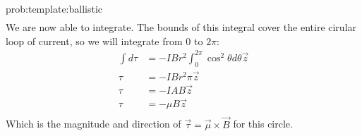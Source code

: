 \begin{solution}{prob:template:ballistic}
\begin{align*}
	\end{align*}
	We are now able to integrate. The bounds of this integral cover the entire cirular loop of current, so we will integrate from $0$ to $2\pi$:
	\begin{align*}
	\int d\tau &= -IBr^2 \int_{0}^{2\pi}\cos^2\theta d\theta \vec z \\
	\tau &= -IBr^2 \pi \vec z \\
	\tau &= -IAB \vec z\\
	\tau &= -\mu B \vec z\\
	\end{align*}
	Which is the magnitude and direction of $\vec \tau = \vec \mu \times \vec B$ for this circle.
\end{solution}




